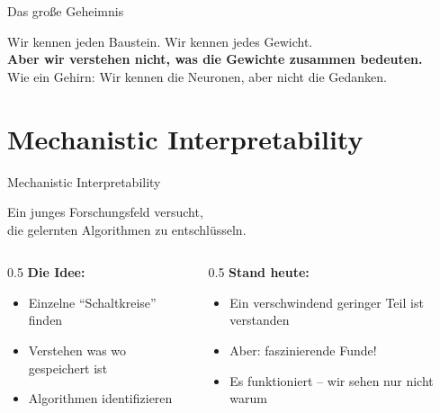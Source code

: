 \documentclass[aspectratio=169,14pt]{beamer}
\begin{document}
\begin{frame}{Das gro\ss e Geheimnis}
\begin{center}
\end{center}
\vspace{0.4cm}
\centering
Wir kennen jeden Baustein. Wir kennen jedes Gewicht.\\[0.2cm]
\textbf{Aber wir verstehen nicht, was die Gewichte zusammen bedeuten.}\\[0.2cm]
\small Wie ein Gehirn: Wir kennen die Neuronen, aber nicht die Gedanken.
\end{frame}

\section{Mechanistic Interpretability}

\begin{frame}{Mechanistic Interpretability}
\begin{center}
\large Ein junges Forschungsfeld versucht,\\die gelernten Algorithmen zu entschlüsseln.
\end{center}
\vspace{0.5cm}
\begin{columns}
\begin{column}{0.5\textwidth}
\textbf{Die Idee:}
\begin{itemize}
\item Einzelne ``Schaltkreise'' finden
\item Verstehen was wo gespeichert ist
\item Algorithmen identifizieren
\end{itemize}
\end{column}
\begin{column}{0.5\textwidth}
\textbf{Stand heute:}
\begin{itemize}
\item Ein verschwindend geringer Teil ist verstanden
\item Aber: faszinierende Funde!
\item Es funktioniert -- wir sehen nur nicht warum
\end{itemize}
\end{column}
\end{columns}
\end{frame}
\end{document}
